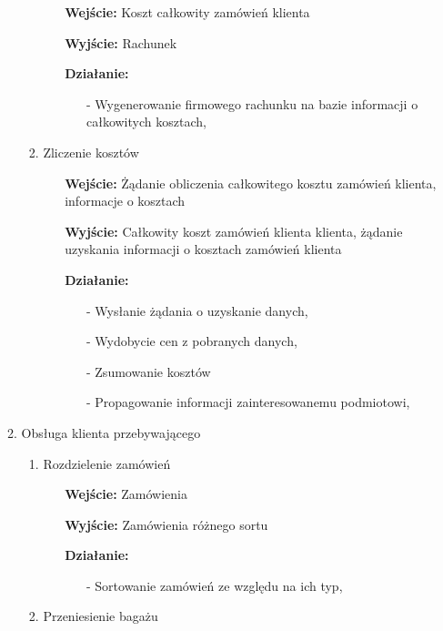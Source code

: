 \documentclass[a4paper, 11pt]{article}
\begin{document}
\begin{enumerate}[label*=\arabic*.]
\begin{enumerate}[label*=\arabic*.]
\begin{enumerate}[label*=\arabic*.]
				\begin{itemize}
					\item [\textbf{Wejście:}] Koszt całkowity zamówień klienta
					\item [\textbf{Wyjście:}] Rachunek
					\item [\textbf{Działanie:}] 
					\begin{itemize}
						\item[-] Wygenerowanie firmowego rachunku na bazie informacji o całkowitych kosztach,
					\end{itemize}
				\end{itemize}
				\item Zliczenie kosztów
				\begin{itemize}
					\item [\textbf{Wejście:}] Żądanie obliczenia całkowitego kosztu zamówień klienta, informacje o kosztach
					\item [\textbf{Wyjście:}] Całkowity koszt zamówień klienta klienta, żądanie uzyskania informacji o kosztach zamówień klienta
					\item [\textbf{Działanie:}] 
					\begin{itemize}
						\item[-] Wysłanie żądania o uzyskanie danych,
						\item[-] Wydobycie cen z pobranych danych,
						\item[-] Zsumowanie kosztów
						\item[-] Propagowanie informacji zainteresowanemu podmiotowi,
					\end{itemize}
				\end{itemize}
			\end{enumerate}						
			\item Obsługa klienta przebywającego
			\begin{enumerate}[label*=\arabic*.]
				\item Rozdzielenie zamówień
				\begin{itemize}
					\item [\textbf{Wejście:}] Zamówienia
					\item [\textbf{Wyjście:}] Zamówienia różnego sortu
					\item [\textbf{Działanie:}] 
					\begin{itemize}
						\item[-] Sortowanie zamówień ze względu na ich typ,									\end{itemize}
				\end{itemize}
				\item Przeniesienie bagażu

\end{enumerate}
\end{enumerate}
\end{enumerate}
\end{document}

